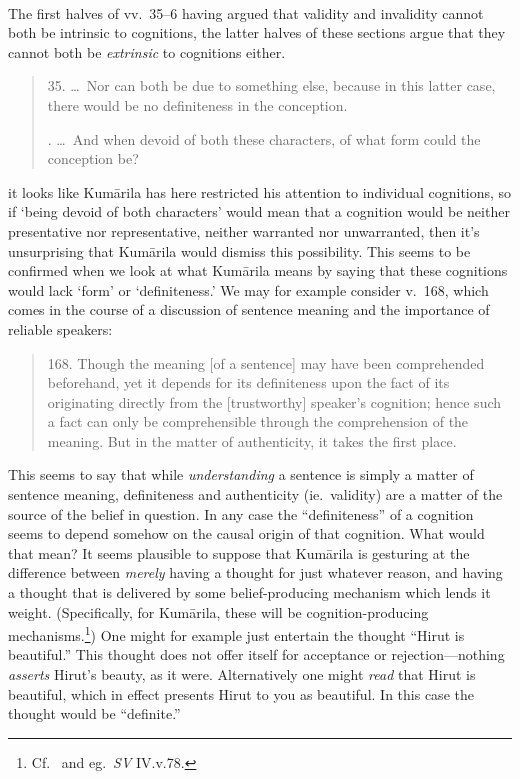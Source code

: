 ﻿\documentclass[11pt]{amsart}
\begin{document}
\

The first halves of vv.~35--6 having argued that validity and invalidity cannot both be intrinsic to cognitions, the latter halves of these sections argue that they cannot both be \emph{extrinsic} to cognitions either.\small \begin{quote} 35. \ldots \ Nor can both be due to something else, because in this latter case, there would be no definiteness in the conception.

. \ldots \ And when devoid of both these characters, of what form could the conception be?\end{quote}\normalsize it looks like Kum\=arila has here restricted his attention to individual cognitions, so if `being devoid of both characters' would mean that a cognition would be neither presentative nor representative, neither warranted nor unwarranted, then it's unsurprising that Kum\=arila would dismiss this possibility. This seems to be confirmed when we look at what Kum\=arila means by saying that these cognitions would lack `form' or `definiteness.' We may for example consider v.~168, which comes in the course of a discussion of sentence meaning and the importance of reliable speakers:\small \begin{quote}168. Though the meaning [of a sentence] may have been comprehended beforehand, yet it depends for its definiteness upon the fact of its originating directly from the [trustworthy] speaker's cognition; hence such a fact can only be comprehensible through the comprehension of the meaning. But in the matter of authenticity, it takes the first place.\end{quote}\normalsize This seems to say that while \emph{understanding} a sentence is simply a matter of sentence meaning, definiteness and authenticity (ie.~validity) are a matter of the source of the belief in question. In any case the ``definiteness'' of a cognition seems to depend somehow on the causal origin of that cognition. What would that mean? It seems plausible to suppose that Kum\=arila is gesturing at the difference between \emph{merely} having a thought for just whatever reason, and having a thought that is delivered by some belief-producing mechanism which lends it weight. (Specifically, for Kum\=arila, these will be cognition-producing mechanisms.\footnote{Cf.~\citet[ch.~1]{sen1984concept} and eg.~\emph{SV} IV.v.78.}) One might for example just entertain the thought ``Hirut is beautiful.'' This thought does not offer itself for acceptance or rejection---nothing \emph{asserts} Hirut's beauty, as it were. Alternatively one might \emph{read} that Hirut is beautiful, which in effect presents Hirut to you as beautiful. In this case the thought would be ``definite.''
\end{document}
